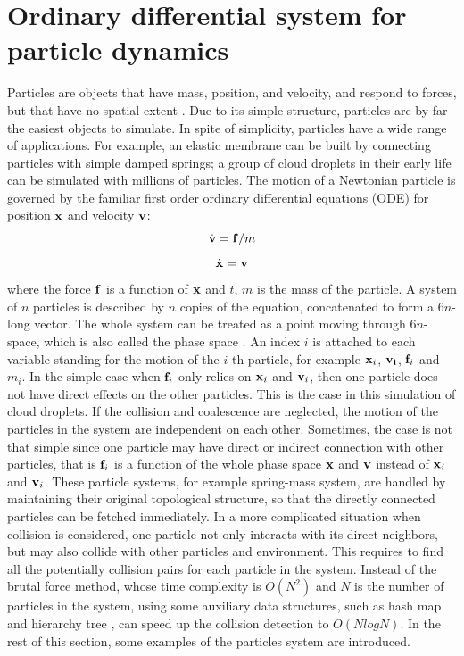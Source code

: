 \section{Ordinary differential system for particle dynamics}
Particles are objects that have mass, position, and velocity, and respond to forces, but that have no spatial extent \cite{witkin1999particle}. Due to its simple structure, particles are by far the easiest objects to simulate. In spite of simplicity, particles have a wide range of applications. For example, an elastic membrane can be built by connecting particles with simple damped springs; a group of cloud droplets in their early life can be simulated with millions of particles. The motion of a Newtonian particle is governed by the familiar first order ordinary differential equations (ODE) for position $\mathbf{x}$ and velocity $\mathbf{v}$:
\begin{equation}
\dot{\mathbf{v}} = \mathbf{f}/m
\label{dv_eqn}
\end{equation}
\begin{equation}
\dot{\mathbf{x}} = \mathbf{v}
\label{dx_eqn}
\end{equation}
where the force $\mathbf{f}$ is a function of $\mathbf{x}$ and $t$, $m$ is the mass of the particle. A system of $n$ particles is described by $n$ copies of the equation, concatenated to form a $6n$-long vector. The whole system can be treated as a point moving through $6n$-space, which is also called the phase space \cite{witkin1999particle}. An index $i$ is attached to each variable standing for the motion of the $i$-th particle, for example $\mathbf{x}_i$, $\mathbf{v_i}$, $\mathbf{f}_i$ and $m_i$. In the simple case when $\mathbf{f}_i$ only relies on $\mathbf{x}_i$ and $\mathbf{v}_i$, then one particle does not have direct effects on the other particles. This is the case in this simulation of cloud droplets. If the collision and coalescence are neglected, the motion of the particles in the system are independent on each other. Sometimes, the case is not that simple since one particle may have direct or indirect connection with other particles, that is $\mathbf{f}_i$ is a function of the whole phase space $\mathbf{x}$ and $\mathbf{v}$ instead of $\mathbf{x}_i$ and $\mathbf{v}_i$. These particle systems, for example spring-mass system, are handled by maintaining their original topological structure, so that the directly connected particles can be fetched immediately. In a more complicated situation when collision is considered, one particle not only interacts with its direct neighbors, but may also collide with other particles and environment. This requires to find all the potentially collision pairs for each particle in the system. Instead of the brutal force method, whose time complexity is $O(N^2)$ and $N$ is the number of particles in the system, using some auxiliary data structures, such as hash map \cite{TeschnerCollision2005} and hierarchy tree \cite{VolinoEfficient1994,BridsonRobust2002}, can speed up the collision detection to $O(NlogN)$. In the rest of this section, some examples of the particles system are introduced.

